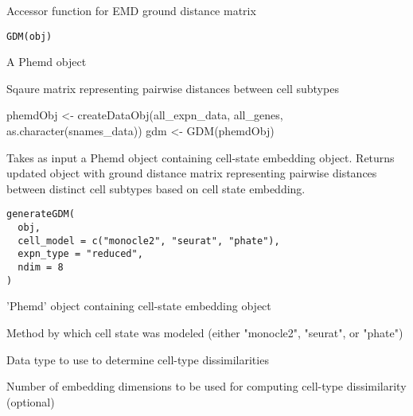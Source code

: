 \documentclass[a4paper]{book}
\begin{document}
%
\begin{Description}\relax
Accessor function for EMD ground distance matrix
\end{Description}
%
\begin{Usage}
\begin{verbatim}
GDM(obj)
\end{verbatim}
\end{Usage}
%
\begin{Arguments}
\begin{ldescription}
\item[\code{obj}] A Phemd object
\end{ldescription}
\end{Arguments}
%
\begin{Value}
Sqaure matrix representing pairwise distances between cell subtypes
\end{Value}
%
\begin{Examples}
\begin{ExampleCode}
phemdObj <- createDataObj(all_expn_data, all_genes, as.character(snames_data))
gdm <- GDM(phemdObj)

\end{ExampleCode}
\end{Examples}
%
\begin{Description}\relax
Takes as input a Phemd object containing cell-state embedding object. Returns updated object with ground distance matrix representing pairwise distances between distinct cell subtypes based on cell state embedding.
\end{Description}
%
\begin{Usage}
\begin{verbatim}
generateGDM(
  obj,
  cell_model = c("monocle2", "seurat", "phate"),
  expn_type = "reduced",
  ndim = 8
)
\end{verbatim}
\end{Usage}
%
\begin{Arguments}
\begin{ldescription}
\item[\code{obj}] 'Phemd' object containing cell-state embedding object

\item[\code{cell\_model}] Method by which cell state was modeled (either "monocle2", "seurat", or "phate")

\item[\code{expn\_type}] Data type to use to determine cell-type dissimilarities

\item[\code{ndim}] Number of embedding dimensions to be used for computing cell-type dissimilarity (optional)
\end{ldescription}
\end{Arguments}
\end{document}

